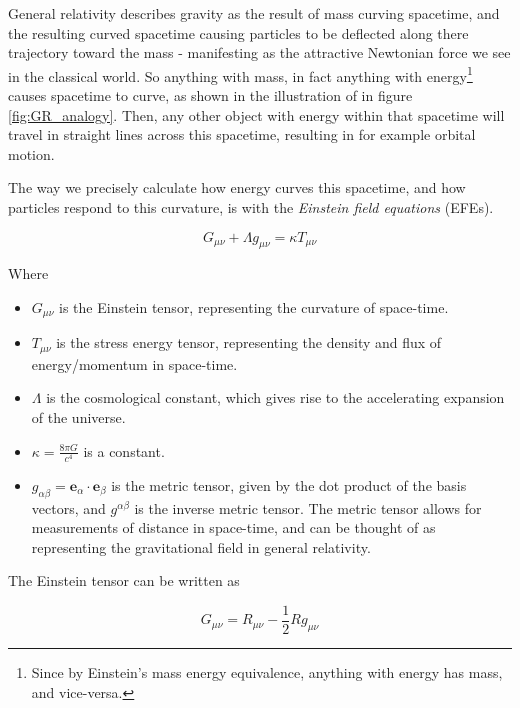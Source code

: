 General relativity describes gravity as the result of mass curving spacetime, and the resulting curved spacetime causing particles to be deflected along there trajectory toward the mass - manifesting as the attractive Newtonian force we see in the classical world. So anything with mass, in fact anything with energy\footnote{Since by Einstein's mass energy equivalence, anything with energy has mass, and vice-versa.} causes spacetime to curve, as shown in the illustration of in figure \ref{fig:GR_analogy}. Then, any other object with energy within that spacetime will travel in straight lines across this spacetime, resulting in for example orbital motion. 

The way we precisely calculate how energy curves this spacetime, and how particles respond to this curvature, is with the \textit{Einstein field equations} (EFEs).

\begin{equation}
    G_{\mu \nu} + \Lambda g_{\mu \nu} = \kappa T_{\mu \nu}
\label{eq:EFE}
\end{equation}

Where 

\begin{itemize}
    \item $G_{\mu \nu}$ is the Einstein tensor, representing the curvature of space-time.
    
    \item $T_{\mu \nu}$ is the stress energy tensor, representing the density and flux of energy/momentum in space-time.
    
    \item $\Lambda$ is the cosmological constant, which gives rise to the accelerating expansion of the universe.
    
    \item $\kappa=\frac{8\pi G}{c^4}$ is a constant.
    
    \item $g_{\alpha \beta} = \boldsymbol{e}_\alpha \cdot \boldsymbol{e}_\beta$ is the metric tensor, given by the dot product of the basis vectors, and $g^{\alpha \beta}$ is the inverse metric tensor. The metric tensor allows for measurements of distance in space-time, and can be thought of as representing the gravitational field in general relativity.
 \end{itemize}


The Einstein tensor can be written as

\begin{equation}
    G_{\mu \nu } = R_{\mu \nu} - \frac{1}{2} R g_{\mu \nu}
\label{eq:Einstein tensor}
\end{equation}

